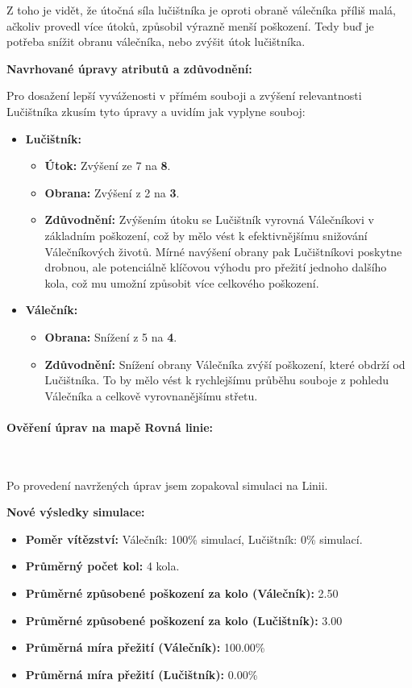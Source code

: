 Z toho je vidět, že útočná síla lučištníka je oproti obraně válečníka příliš malá, ačkoliv provedl více útoků, způsobil výrazně menší poškození. Tedy buď je potřeba snížit obranu válečníka, nebo zvýšit útok lučištníka.

\textbf{Navrhované úpravy atributů a zdůvodnění:}

Pro dosažení lepší vyváženosti v přímém souboji a zvýšení relevantnosti Lučištníka zkusím tyto úpravy a uvidím jak vyplyne souboj:

\begin{itemize}
    \item \textbf{Lučištník:}
    \begin{itemize}
        \item \textbf{Útok:} Zvýšení ze 7 na \textbf{8}.
        \item \textbf{Obrana:} Zvýšení z 2 na \textbf{3}.
        \item \textbf{Zdůvodnění:} Zvýšením útoku se Lučištník vyrovná Válečníkovi v základním poškození, což by mělo vést k efektivnějšímu snižování Válečníkových životů. Mírné navýšení obrany pak Lučištníkovi poskytne drobnou, ale potenciálně klíčovou výhodu pro přežití jednoho dalšího kola, což mu umožní způsobit více celkového poškození.
    \end{itemize}
    \item \textbf{Válečník:}
    \begin{itemize}
        \item \textbf{Obrana:} Snížení z 5 na \textbf{4}.
        \item \textbf{Zdůvodnění:} Snížení obrany Válečníka zvýší poškození, které obdrží od Lučištníka. To by mělo vést k rychlejšímu průběhu souboje z pohledu Válečníka a celkově vyrovnanějšímu střetu.
    \end{itemize}
\end{itemize}

\paragraph{Ověření úprav na mapě Rovná linie:}~ \newline

Po provedení navržených úprav jsem zopakoval simulaci na Linii.

\textbf{Nové výsledky simulace:}
\begin{itemize}
\item \textbf{Poměr vítězství:} Válečník: 100\% simulací, Lučištník: 0\% simulací.
\item \textbf{Průměrný počet kol:} 4 kola.
\item \textbf{Průměrné způsobené poškození za kolo (Válečník):} 2.50
\item \textbf{Průměrné způsobené poškození za kolo (Lučištník):} 3.00
\item \textbf{Průměrná míra přežití (Válečník):} 100.00\%
\item \textbf{Průměrná míra přežití (Lučištník):} 0.00\%
\end{itemize}

